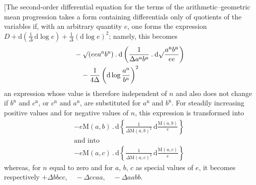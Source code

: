 \begingroup
\renewcommand{\arraystretch}{1.45}
[The second-order differential equation for the terms of the arithmetic–geometric mean progression takes a form containing differentials only of quotients of the variables if, with an arbitrary quantity $e$, one forms the expression
$D+\mathrm d(\frac{1}{\Delta}\,\allowbreak \mathrm d\log e)+\frac{1}{\Delta}(\mathrm d\log e)^2$;
namely, this becomes
\[
\begin{aligned}&-\surd(eea^{\mathrm n}b^{\mathrm n})\mathbin{.}\mathrm d
\left(\frac{1}{\Delta a^{\mathrm n}b^{\mathrm n}}\mathbin{.}\mathrm d
\surd\frac{a^{\mathrm n}b^{\mathrm n}}{ee}\right)\\&\quad-\frac{1}{4\Delta}\left(\mathrm d\log\frac{a^{\mathrm n}}{b^{\mathrm n}}\right)^2\end{aligned}
\]
an expression whose value is therefore independent of $n$ and also does not change if $b^{\mathrm n}$ and $c^{\mathrm n}$, or $c^{\mathrm n}$ and
$a^{\mathrm n}$, are substituted for $a^{\mathrm n}$ and $b^{\mathrm n}$. For steadily increasing positive values and for negative values of $n$, this expression is transformed into
\[
\begin{gathered}-e\mathrm M(a,b)\mathbin{.}\mathrm d
\left\{\frac{1}{\Delta\mathrm M(a,b)^2}\,\mathrm d\frac{\mathrm M(a,b)}{e}\right\}
\\[7pt]\mbox{and into}\\[7pt]
-e\mathrm M(a,c)\mathbin{.}\mathrm d
\left\{\frac{1}{\Delta\mathrm M(a,c)^2}\,\mathrm d\frac{\mathrm M(a,c)}{e}\right\}\end{gathered}
\]
whereas, for $n$ equal to zero and for $a$, $b$, $c$ as special values of $e$, it becomes respectively $+\Delta bbcc,\quad-\Delta ccaa,\quad-\Delta aabb.$

